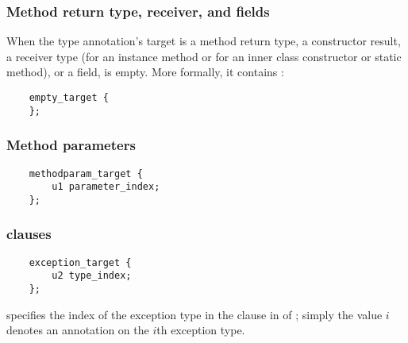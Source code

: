 \documentclass[10pt]{article}
\begin{document}
\subsubsection{Method return type, receiver, and fields\label{class-file:ext:ri:return}\label{class-file:ext:ri:receiver}}

When the type annotation's target is a method return type, a constructor
result, a receiver type (for an instance method or for an inner class
constructor or static method), or a field,  is empty.
More formally, it contains :

\preverbnegspace
\begin{Verbatim}
    empty_target {
    };
\end{Verbatim}



\subsubsection{Method parameters\label{class-file:ext:ri:parameters}}


\preverbnegspace
\begin{Verbatim}
    methodparam_target {
        u1 parameter_index;
    };
\end{Verbatim}



\subsubsection{ clauses\label{class-file:ext:ri:throws}}


\preverbnegspace
\begin{Verbatim}
    exception_target {
        u2 type_index;
    };
\end{Verbatim}

 specifies the index of the exception type in the
clause in  of ;
simply the value $i$ denotes an annotation on the $i$th exception
type.
\end{document}
